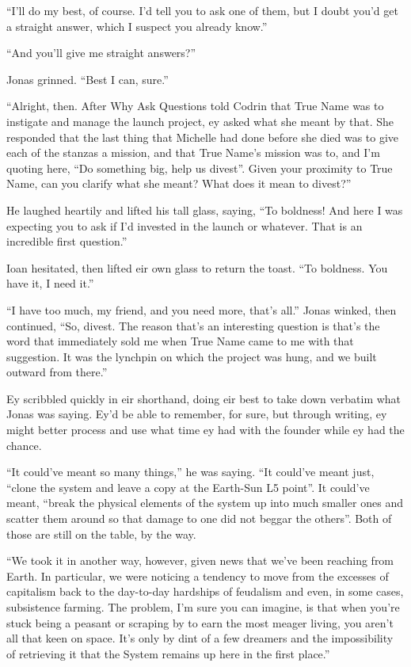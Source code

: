``I'll do my best, of course. I'd tell you to ask one of them, but I doubt you'd get a straight answer, which I suspect you already know.''

``And you'll give me straight answers?''

Jonas grinned. ``Best I can, sure.''

``Alright, then. After Why Ask Questions told Codrin that True Name was to instigate and manage the launch project, ey asked what she meant by that. She responded that the last thing that Michelle had done before she died was to give each of the stanzas a mission, and that True Name's mission was to, and I'm quoting here, ``Do something big, help us divest''. Given your proximity to True Name, can you clarify what she meant? What does it mean to divest?''

He laughed heartily and lifted his tall glass, saying, ``To boldness! And here I was expecting you to ask if I'd invested in the launch or whatever. That is an incredible first question.''

Ioan hesitated, then lifted eir own glass to return the toast. ``To boldness. You have it, I need it.''

``I have too much, my friend, and you need more, that's all.'' Jonas winked, then continued, ``So, divest. The reason that's an interesting question is that's the word that immediately sold me when True Name came to me with that suggestion. It was the lynchpin on which the project was hung, and we built outward from there.''

Ey scribbled quickly in eir shorthand, doing eir best to take down verbatim what Jonas was saying. Ey'd be able to remember, for sure, but through writing, ey might better process and use what time ey had with the founder while ey had the chance.

``It could've meant so many things,'' he was saying. ``It could've meant just, ``clone the system and leave a copy at the Earth-Sun L5 point''. It could've meant, ``break the physical elements of the system up into much smaller ones and scatter them around so that damage to one did not beggar the others''. Both of those are still on the table, by the way.

``We took it in another way, however, given news that we've been reaching from Earth. In particular, we were noticing a tendency to move from the excesses of capitalism back to the day-to-day hardships of feudalism and even, in some cases, subsistence farming. The problem, I'm sure you can imagine, is that when you're stuck being a peasant or scraping by to earn the most meager living, you aren't all that keen on space. It's only by dint of a few dreamers and the impossibility of retrieving it that the System remains up here in the first place.''

